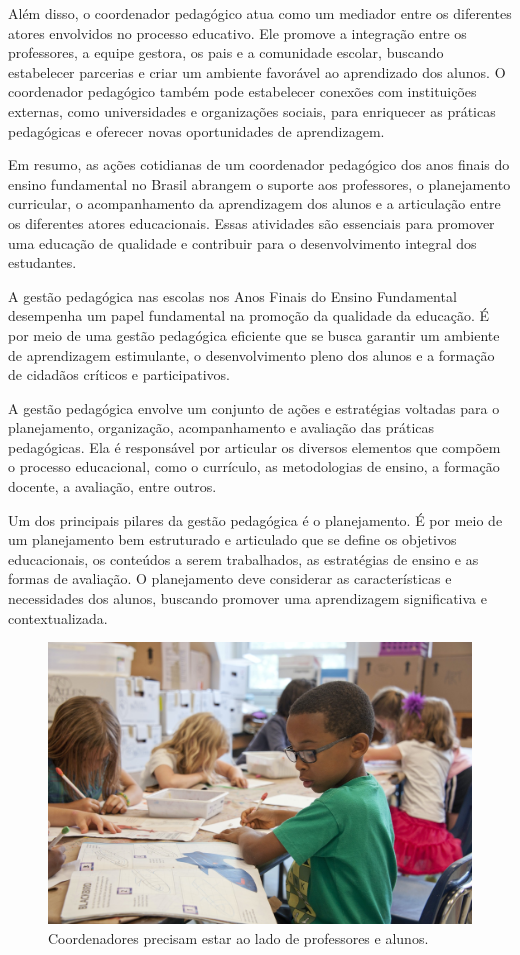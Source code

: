 Além disso, o coordenador pedagógico atua como um mediador entre os diferentes atores envolvidos no processo educativo. Ele promove a integração entre os professores, a equipe gestora, os pais e a comunidade escolar, buscando estabelecer parcerias e criar um ambiente favorável ao aprendizado dos alunos. O coordenador pedagógico também pode estabelecer conexões com instituições externas, como universidades e organizações sociais, para enriquecer as práticas pedagógicas e oferecer novas oportunidades de aprendizagem.

Em resumo, as ações cotidianas de um coordenador pedagógico dos anos finais do ensino fundamental no Brasil abrangem o suporte aos professores, o planejamento curricular, o acompanhamento da aprendizagem dos alunos e a articulação entre os diferentes atores educacionais. Essas atividades são essenciais para promover uma educação de qualidade e contribuir para o desenvolvimento integral dos estudantes.



A gestão pedagógica nas escolas nos Anos Finais do Ensino Fundamental
desempenha um papel fundamental na promoção da qualidade da educação. É
por meio de uma gestão pedagógica eficiente que se busca garantir um
ambiente de aprendizagem estimulante, o desenvolvimento pleno dos alunos
e a formação de cidadãos críticos e participativos.

A gestão pedagógica envolve um conjunto de ações e estratégias voltadas
para o planejamento, organização, acompanhamento e avaliação das
práticas pedagógicas. Ela é responsável por articular os diversos
elementos que compõem o processo educacional, como o currículo, as
metodologias de ensino, a formação docente, a avaliação, entre outros.

Um dos principais pilares da gestão pedagógica é o planejamento. É por
meio de um planejamento bem estruturado e articulado que se define os
objetivos educacionais, os conteúdos a serem trabalhados, as estratégias
de ensino e as formas de avaliação. O planejamento deve considerar as
características e necessidades dos alunos, buscando promover uma
aprendizagem significativa e contextualizada.

\begin{figure}[t]
\centering
\includegraphics[width=\textwidth]{./imgs/Imagem004.jpg}
\caption{Coordenadores precisam estar ao lado de professores e alunos.}
\end{figure}

